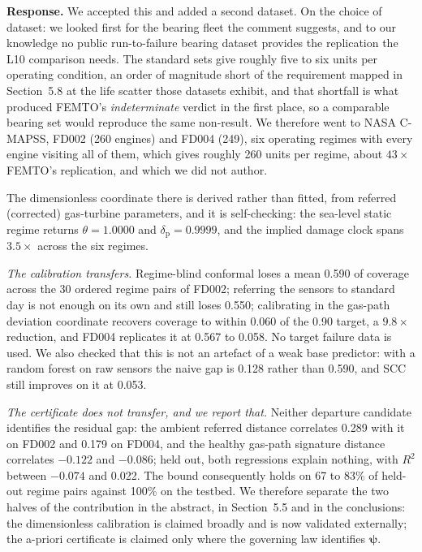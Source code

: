\documentclass[11pt,a4paper]{article}
\begin{document}
\noindent\textbf{Response.} We accepted this and added a second dataset. On the choice of dataset:
we looked first for the bearing fleet the comment suggests, and to our knowledge no public
run-to-failure bearing dataset provides the replication the L10 comparison needs. The standard sets
give roughly five to six units per operating condition, an order of magnitude short of the
requirement mapped in Section~5.8 at the life scatter those datasets exhibit, and that shortfall is
what produced FEMTO's \emph{indeterminate} verdict in the first place, so a comparable bearing set
would reproduce the same non-result. We therefore went to NASA C-MAPSS, FD002 (260 engines) and
FD004 (249), six operating regimes with every engine visiting all of them, which gives roughly 260
units per regime, about $43\times$ FEMTO's replication, and which we did not author.

The dimensionless coordinate there is derived rather than fitted, from referred (corrected)
gas-turbine parameters, and it is self-checking: the sea-level static regime returns
$\theta=1.0000$ and $\delta_{\mathrm{p}}=0.9999$, and the implied damage clock spans $3.5\times$
across the six regimes.

\emph{The calibration transfers.} Regime-blind conformal loses a mean 0.590 of coverage across the
30 ordered regime pairs of FD002; referring the sensors to standard day is not enough on its own and
still loses 0.550; calibrating in the gas-path deviation coordinate recovers coverage to within
0.060 of the 0.90 target, a $9.8\times$ reduction, and FD004 replicates it at 0.567 to 0.058. No
target failure data is used. We also checked that this is not an artefact of a weak base predictor:
with a random forest on raw sensors the naive gap is 0.128 rather than 0.590, and SCC still improves
on it at 0.053.

\emph{The certificate does not transfer, and we report that.} Neither departure candidate identifies
the residual gap: the ambient referred distance correlates 0.289 with it on FD002 and
0.179 on FD004, and the healthy gas-path signature distance correlates $-0.122$ and $-0.086$; held
out, both regressions explain nothing, with $R^2$ between $-0.074$ and 0.022. The bound consequently
holds on 67 to 83\% of held-out regime pairs against 100\% on the testbed. We therefore separate the
two halves of the contribution in the abstract, in Section~5.5 and in the conclusions: the
dimensionless calibration is claimed broadly and is now validated externally; the a-priori
certificate is claimed only where the governing law identifies $\boldsymbol\psi$.
\end{document}
